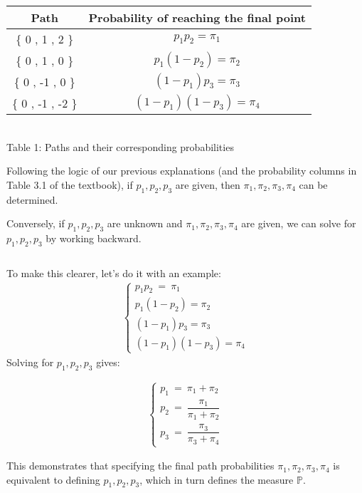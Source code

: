 \documentclass[uplatex,a4j,12pt,dvipdfmx]{jsarticle}
\begin{document}
\begin{center}
	\begin{tabular}{|c|c|} \hline
		Path              & Probability of reaching the final point \\ \hline
		\{ 0 , 1 , 2 \}   & $p_{1} p_{2} = \pi_{1} $                \\ \hline
		\{ 0 , 1 , 0 \}   & $p_{1} (1 - p_{2}) = \pi_{2} $          \\ \hline
		\{ 0 , -1 , 0 \}  & $(1-p_{1}) p_{3} = \pi_{3} $            \\ \hline
		\{ 0 , -1 , -2 \} & $(1-p_{1}) (1 - p_{3}) = \pi_{4} $      \\ \hline
	\end{tabular}
	\\ Table 1: Paths and their corresponding probabilities
\end{center}

Following the logic of our previous explanations (and the probability columns in Table 3.1 of the textbook), if $p_{1},p_{2},p_{3}$ are given, then $\pi_{1},\pi_{2},\pi_{3},\pi_{4}$ can be determined.

Conversely, if $p_{1},p_{2},p_{3}$ are unknown and $\pi_{1},\pi_{2},\pi_{3},\pi_{4}$ are given, we can solve for $p_{1},p_{2},p_{3}$ by working backward.

${}$

To make this clearer, let's do it with an example:
%
\begin{eqnarray*}
	\left\{
	\begin{array}{r}
		p_{1} p_{2} \ = \ \pi_{1}
		\\
		p_{1} (1 - p_{2}) = \pi_{2}
		\\
		(1 - p_{1}) p_{3} = \pi_{3}
		\\
		(1 - p_{1}) (1 -p_{3}) = \pi_{4}
	\end{array}
	\right.
\end{eqnarray*}
%
Solving for $p_{1},p_{2},p_{3}$ gives:

\begin{eqnarray*}
	\left\{
	\begin{array}{c}
		p_{1} \ = \ \pi_{1} + \pi_{2}
		\\[3mm]
		p_{2} \ = \ \dfrac{\pi_{1}}{ \pi_{1} + \pi_{2} }
		\\[3mm]
		p_{3} \ = \ \dfrac{\pi_{3}}{ \pi_{3} + \pi_{4} }
	\end{array}
	\right.
\end{eqnarray*}

This demonstrates that specifying the final path probabilities $\pi_{1},\pi_{2},\pi_{3},\pi_{4}$ is equivalent to defining $p_{1},p_{2},p_{3}$, which in turn defines the measure $\mathbb{P}$.
\end{document}
